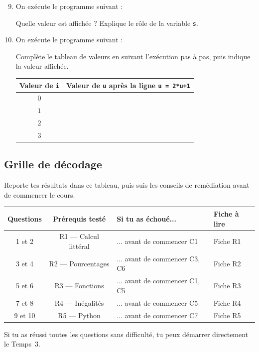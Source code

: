 \begin{enumerate}
  \setcounter{enumi}{8}

  \item On exécute le programme suivant :



  Quelle valeur est affichée ? Explique le rôle de la variable \texttt{s}.

  \item On exécute le programme suivant :



  Complète le tableau de valeurs en suivant l'exécution pas à pas, puis indique la valeur affichée.

  \begin{center}
  \begin{tabular}{|c|c|}
  \hline
  Valeur de \texttt{i} & Valeur de \texttt{u} après la ligne \texttt{u = 2*u+1} \\
  \hline
  $0$ & \phantom{xxx} \\
  \hline
  $1$ & \phantom{xxx} \\
  \hline
  $2$ & \phantom{xxx} \\
  \hline
  $3$ & \phantom{xxx} \\
  \hline
  \end{tabular}
  \end{center}

\end{enumerate}

\bigskip

\subsection*{Grille de décodage}

Reporte tes résultats dans ce tableau, puis suis les conseils de remédiation avant de commencer le cours.

\begin{center}
\begin{tabular}{|c|c|l|l|}
\hline
\textbf{Questions} & \textbf{Prérequis testé} & \textbf{Si tu as échoué...} & \textbf{Fiche à lire} \\
\hline
1 et 2 & R1 — Calcul littéral & ... avant de commencer C1 & Fiche R1 \\
\hline
3 et 4 & R2 — Pourcentages & ... avant de commencer C3, C6 & Fiche R2 \\
\hline
5 et 6 & R3 — Fonctions & ... avant de commencer C1, C5 & Fiche R3 \\
\hline
7 et 8 & R4 — Inégalités & ... avant de commencer C5 & Fiche R4 \\
\hline
9 et 10 & R5 — Python & ... avant de commencer C7 & Fiche R5 \\
\hline
\end{tabular}
\end{center}

\bigskip

Si tu as réussi toutes les questions sans difficulté, tu peux démarrer directement le Temps~3.

